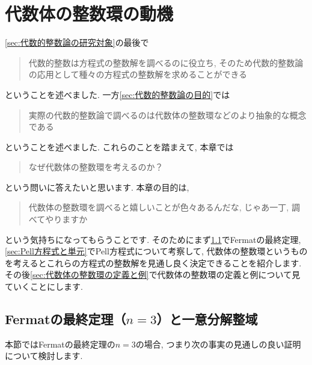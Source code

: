 \documentclass[11pt,b5paper,oneside,titlepage,lualatex]{ltjsreport}
\numberwithin{equation}{section} %
\begin{document}
\clearpage





\chapter{代数体の整数環の動機} \label{chap:代数体の整数環の動機}


\cref{sec:代数的整数論の研究対象}の最後で
\begin{quote}
	\centering
	代数的整数は方程式の整数解を調べるのに役立ち, そのため代数的整数論の応用として種々の方程式の整数解を求めることができる
\end{quote}
ということを述べました. 
一方\cref{sec:代数的整数論の目的}では
\begin{quote}
	\centering
	実際の代数的整数論で調べるのは代数体の整数環などのより抽象的な概念である
\end{quote}
ということを述べました. 
これらのことを踏まえて, 本章では
\begin{quote}
	\centering
	なぜ代数体の整数環を考えるのか？
\end{quote}
という問いに答えたいと思います. 
本章の目的は, 
\begin{quote}
	\centering
	代数体の整数環を調べると嬉しいことが色々あるんだな, じゃあ一丁, 調べてやりますか
\end{quote}
という気持ちになってもらうことです. 
そのためにまず\cref{sec:Fermatの最終定理と一意分解整域}でFermatの最終定理, \cref{sec:Pell方程式と単元}でPell方程式について考察して, 代数体の整数環というものを考えるとこれらの方程式の整数解を見通し良く決定できることを紹介します. 
その後\cref{sec:代数体の整数環の定義と例}で代数体の整数環の定義と例について見ていくことにします. 


\section{Fermatの最終定理（$ n=3 $）と一意分解整域} \label{sec:Fermatの最終定理と一意分解整域}


本節ではFermatの最終定理の$ n=3 $の場合, つまり次の事実の見通しの良い証明について検討します. 
\end{document}
